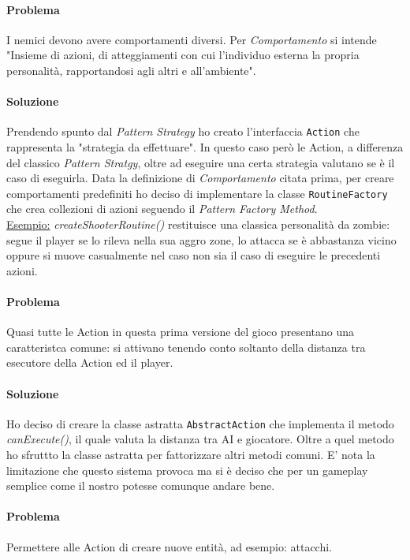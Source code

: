\documentclass[a4paper,12pt]{report}
\begin{document}
\paragraph{Problema}
I nemici devono avere comportamenti diversi.
Per \textit{Comportamento} si intende "Insieme di azioni, di atteggiamenti con cui 
l'individuo esterna la propria personalità, rapportandosi agli altri e all'ambiente".
\paragraph{Soluzione}
Prendendo spunto dal \textit{Pattern Strategy} ho creato l'interfaccia \texttt{Action} che rappresenta
la "strategia da effettuare".
In questo caso però le Action, a differenza del classico \textit{Pattern Stratgy}, 
oltre ad eseguire una certa strategia valutano se è il caso di eseguirla.
Data la definizione di \textit{Comportamento} citata prima, per creare comportamenti predefiniti 
ho deciso di implementare la classe \texttt{RoutineFactory} che crea collezioni di azioni 
seguendo il \textit{Pattern Factory Method}.\\

\underline{Esempio:} \textit{createShooterRoutine()} restituisce una classica personalità da zombie:
segue il player se lo rileva nella sua aggro zone, lo attacca se è abbastanza vicino oppure si muove
casualmente nel caso non sia il caso di eseguire le precedenti azioni.

\paragraph{Problema}
Quasi tutte le Action in questa prima versione del gioco presentano una caratteristca comune:
si attivano tenendo conto soltanto della distanza tra esecutore della Action ed il player.
\paragraph{Soluzione}
Ho deciso di creare la classe astratta \texttt{AbstractAction} che implementa il metodo \textit{canExecute()}, il quale 
valuta la distanza tra AI e giocatore. Oltre a quel metodo ho sfruttto la classe astratta per 
fattorizzare altri metodi comuni. E' nota la limitazione che questo sistema provoca 
ma si è deciso che per un gameplay semplice come il nostro potesse comunque andare bene.

\paragraph{Problema}
Permettere alle Action di creare nuove entità, ad esempio: attacchi.
\end{document}
